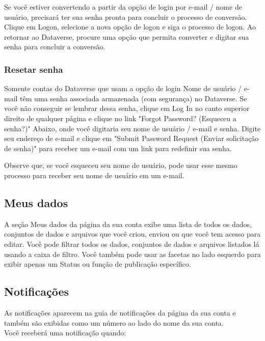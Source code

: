 \documentclass[12pt,hidelinks]{article}
\begin{document}
Se você estiver convertendo a partir da opção de login por e-mail / nome de usuário, precisará ter sua senha pronta para concluir o processo de conversão. Clique em Logon, selecione a nova opção de logon e siga o processo de logon. Ao retornar ao Dataverse, procure uma opção que permita converter e digitar sua senha para concluir a conversão.

        \subsubsection{Resetar senha}
     	
        
\qquad Somente contas do Dataverse que usam a opção de login Nome de usuário / e-mail têm uma senha associada armazenada (com segurança) no Dataverse. Se você não conseguir se lembrar dessa senha, clique em Log In no canto superior direito de qualquer página e clique no link "Forgot Password? (Esqueceu a senha?)" Abaixo, onde você digitaria seu nome de usuário / e-mail e senha. Digite seu endereço de e-mail e clique em "Submit Password Request (Enviar solicitação de senha)" para receber um e-mail com um link para redefinir sua senha.

Observe que, se você esqueceu seu nome de usuário, pode usar esse mesmo processo para receber seu nome de usuário em um e-mail.
     	
    \subsection{Meus dados}
     	
\qquad A seção Meus dados da página da sua conta exibe uma lista de todos os dados, conjuntos de dados e arquivos que você criou, enviou ou que você tem acesso para editar. Você pode filtrar todos os dados, conjuntos de dados e arquivos listados lá usando a caixa de filtro. Você também pode usar as facetas no lado esquerdo para exibir apenas um Status ou função de publicação específico.
     	
    \subsection{Notificações}
     	
\qquad As notificações aparecem na guia de notificações da página da sua conta e também são exibidas como um número ao lado do nome da sua conta.\\

Você receberá uma notificação quando:
\end{document}
